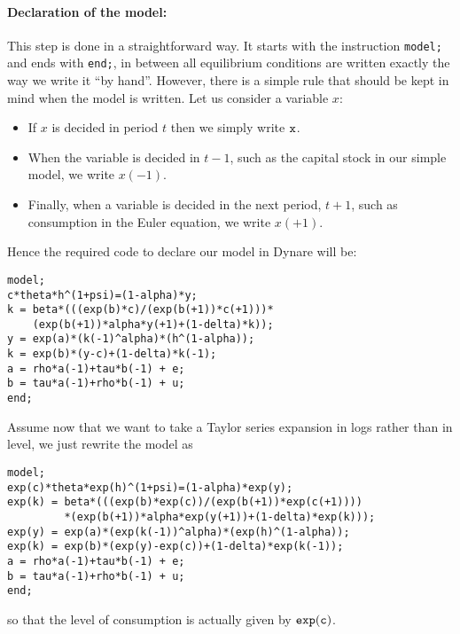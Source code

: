 \documentclass[11pt,a4paper]{article}
\begin{document}
\paragraph{Declaration of the model:}
This step is done in a straightforward way. It starts with the instruction {\tt model;} and ends with {\tt end;}, in between all equilibrium conditions are written exactly the way we write it ``by hand''. However, there is a simple rule that should be kept in mind when the model is written. Let us consider a variable $x$: 
\begin{itemize}
\item If $x$ is decided in period $t$ then we simply write ${\tt x}$. 
\item When the variable is decided in $t-1$, such as the capital stock in our simple model, we write $x(-1)$. \item Finally, when a variable is decided in the next period, $t+1$, such as consumption in the Euler equation, we write $x(+1)$. 
\end{itemize}
Hence the required code to declare our model in {\sc Dynare} will be:
\begin{verbatim}
model;
c*theta*h^(1+psi)=(1-alpha)*y;
k = beta*(((exp(b)*c)/(exp(b(+1))*c(+1)))*
    (exp(b(+1))*alpha*y(+1)+(1-delta)*k));
y = exp(a)*(k(-1)^alpha)*(h^(1-alpha));
k = exp(b)*(y-c)+(1-delta)*k(-1);
a = rho*a(-1)+tau*b(-1) + e;
b = tau*a(-1)+rho*b(-1) + u;
end;
\end{verbatim}
Assume now that we want to take a Taylor series expansion in logs rather than in level, we just rewrite the model as
\begin{verbatim}
model;
exp(c)*theta*exp(h)^(1+psi)=(1-alpha)*exp(y);
exp(k) = beta*(((exp(b)*exp(c))/(exp(b(+1))*exp(c(+1))))
         *(exp(b(+1))*alpha*exp(y(+1))+(1-delta)*exp(k)));
exp(y) = exp(a)*(exp(k(-1))^alpha)*(exp(h)^(1-alpha));
exp(k) = exp(b)*(exp(y)-exp(c))+(1-delta)*exp(k(-1));
a = rho*a(-1)+tau*b(-1) + e;
b = tau*a(-1)+rho*b(-1) + u;
end;
\end{verbatim}
so that the level of consumption is actually given by ${\tt exp(c)}$.
\end{document}
